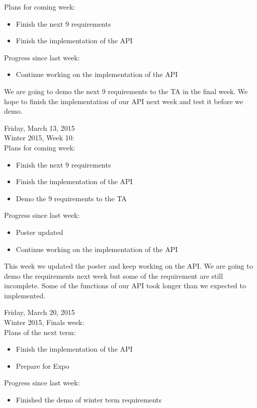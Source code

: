 Plans for coming week:
\begin{itemize}
\item Finish the next 9 requirements
\item Finish the implementation of the API
\end{itemize}

Progress since last week:
\begin{itemize}
\item Continue working on the implementation of the API
\end{itemize}

We are going to demo the next 9 requirements to the TA in the final week. We hope to finish the implementation of our API next week and test it before we demo.

Friday, March 13, 2015 \\
Winter 2015, Week 10: \\

Plans for coming week:
\begin{itemize}
\item Finish the next 9 requirements
\item Finish the implementation of the API
\item Demo the 9 requirements to the TA
\end{itemize}

Progress since last week:
\begin{itemize}
\item Poster updated
\item Continue working on the implementation of the API
\end{itemize}

This week we updated the poster and keep working on the API. We are going to demo the requirements next week but some of the requirement are still incomplete. Some of the functions of our API took longer than we expected to implemented.

Friday, March 20, 2015 \\
Winter 2015, Finals week: \\

Plans of the next term:
\begin{itemize}
\item Finish the implementation of the API
\item Prepare for Expo
\end{itemize}

Progress since last week:
\begin{itemize}
\item Finished the demo of winter term requirements
\end{itemize}


